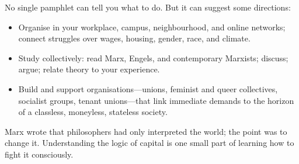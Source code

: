 No single pamphlet can tell you what to do. But it can suggest some
directions:

\begin{itemize}[leftmargin=1.5em]
  \item Organise in your workplace, campus, neighbourhood, and online
  networks; connect struggles over wages, housing, gender, race, and climate.
  \item Study collectively: read Marx, Engels, and contemporary Marxists;
  discuss; argue; relate theory to your experience.
  \item Build and support organisations---unions, feminist and queer
  collectives, socialist groups, tenant unions---that link immediate demands
  to the horizon of a classless, moneyless, stateless society.
\end{itemize}

Marx wrote that philosophers had only interpreted the world; the point was to
change it.\cite{MarxThesesFeuerbach1845} Understanding the logic of capital is one
small part of learning how to fight it consciously.


\clearpage
\appendix

\setcounter{section}{0}

\renewcommand{\thesection}{\Alph{section}}



\clearpage

\glsfirsttitletrue

